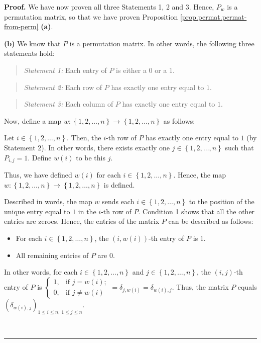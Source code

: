 \documentclass[numbers=enddot,12pt,final,onecolumn,notitlepage]{scrartcl}%
\theoremstyle{definition}
\newenvironment{statement}{\begin{quote}}{\end{quote}}
\newenvironment{proof}[1][Proof]{\noindent\textbf{#1.} }{\ \rule{0.5em}{0.5em}}
\begin{document}
\begin{proof}
We have now proven all three Statements 1, 2 and 3. Hence, $P_{w}$ is a
permutation matrix, so that we have proven Proposition
\ref{prop.permat.permat-from-perm} \textbf{(a)}.

\textbf{(b)} We know that $P$ is a permutation matrix. In other words, the
following three statements hold:

\begin{statement}
\textit{Statement 1:} Each entry of $P$ is either a $0$ or a $1$.
\end{statement}

\begin{statement}
\textit{Statement 2:} Each row of $P$ has exactly one entry equal to $1$.
\end{statement}

\begin{statement}
\textit{Statement 3:} Each column of $P$ has exactly one entry equal to $1$.
\end{statement}

Now, define a map $w:\left\{  1,2,\ldots,n\right\}  \rightarrow\left\{
1,2,\ldots,n\right\}  $ as follows:

Let $i\in\left\{  1,2,\ldots,n\right\}  $. Then, the $i$-th row of $P$ has
exactly one entry equal to $1$ (by Statement 2). In other words, there exists
exactly one $j\in\left\{  1,2,\ldots,n\right\}  $ such that $P_{i,j}=1$.
Define $w\left(  i\right)  $ to be this $j$.

Thus, we have defined $w\left(  i\right)  $ for each $i\in\left\{
1,2,\ldots,n\right\}  $. Hence, the map $w:\left\{  1,2,\ldots,n\right\}
\rightarrow\left\{  1,2,\ldots,n\right\}  $ is defined.

Described in words, the map $w$ sends each $i\in\left\{  1,2,\ldots,n\right\}
$ to the position of the unique entry equal to $1$ in the $i$-th row of $P$.
Condition 1 shows that all the other entries are zeroes. Hence, the entries of
the matrix $P$ can be described as follows:

\begin{itemize}
\item For each $i\in\left\{  1,2,\ldots,n\right\}  $, the $\left(  i,w\left(
i\right)  \right)  $-th entry of $P$ is $1$.

\item All remaining entries of $P$ are $0$.
\end{itemize}

In other words, for each $i\in\left\{  1,2,\ldots,n\right\}  $ and
$j\in\left\{  1,2,\ldots,n\right\}  $, the $\left(  i,j\right)  $-th entry of
$P$ is $%
\begin{cases}
1, & \text{if }j=w\left(  i\right)  ;\\
0, & \text{if }j\neq w\left(  i\right)
\end{cases}
=\delta_{j,w\left(  i\right)  }=\delta_{w\left(  i\right)  ,j}$. Thus, the
matrix $P$ equals $\left(  \delta_{w\left(  i\right)  ,j}\right)  _{1\leq
i\leq n,\ 1\leq j\leq n}$.


\end{proof}
\end{document}
